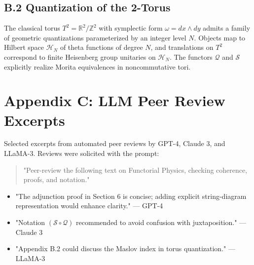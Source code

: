 \documentclass[11pt]{article}
\begin{document}
\subsection*{B.2 Quantization of the 2-Torus}
The classical torus $T^2 = \mathbb R^2/\mathbb Z^2$ with symplectic form $\omega = dx\wedge dy$ admits a family of geometric quantizations parameterized by an integer level $N$.  Objects map to Hilbert space $\mathcal H_N$ of theta functions of degree $N$, and translations on $T^2$ correspond to finite Heisenberg group unitaries on $\mathcal H_N$.  The functors $\mathcal Q$ and $\mathcal S$ explicitly realize Morita equivalences in noncommutative tori.

\newpage
\section*{Appendix C: LLM Peer Review Excerpts}
\label{appendixC}

Selected excerpts from automated peer reviews by GPT-4, Claude 3, and LLaMA-3.  Reviews were solicited with the prompt:
\begin{quotation}
"Peer-review the following text on Functorial Physics, checking coherence, proofs, and notation."
\end{quotation}

\begin{itemize}
  \item "The adjunction proof in Section 6 is concise; adding explicit string-diagram representation would enhance clarity." --- GPT-4
  \item "Notation $(\mathcal S\circ\mathcal Q)$ recommended to avoid confusion with juxtaposition." --- Claude 3
  \item "Appendix B.2 could discuss the Maslov index in torus quantization." --- LLaMA-3
\end{itemize}



\end{document}
